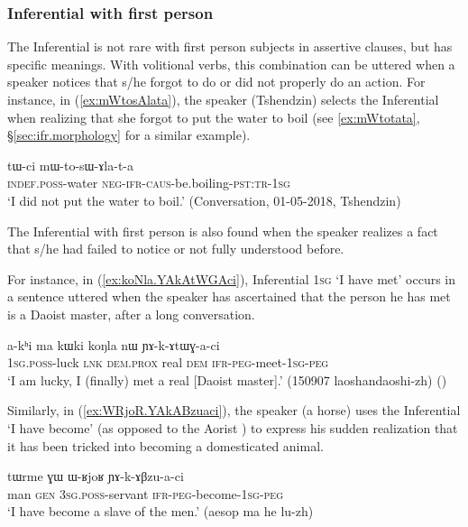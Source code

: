 \subsubsection{Inferential with first person} \label{sec:inf.1person}
The Inferential is not rare with first person subjects in assertive clauses, but has specific meanings.  With volitional verbs, this combination can be uttered when a speaker notices that s/he forgot to do or did not properly do an action. For instance, in (\ref{ex:mWtosAlata}), the speaker (Tshendzin) selects the Inferential when realizing that she forgot to put the water to boil (see \ref{ex:mWtotata}, §\ref{sec:ifr.morphology} for a similar example).

\begin{exe}
\ex \label{ex:mWtosAlata}
\gll tɯ-ci mɯ-to-sɯ-ɤla-t-a \\
\textsc{indef}.\textsc{poss}-water \textsc{neg}-\textsc{ifr}-\textsc{caus}-be.boiling-\textsc{pst}:\textsc{tr}-\textsc{1sg} \\
\glt `I did not put the water to boil.' (Conversation, 01-05-2018, Tshendzin)
\end{exe}

The Inferential with first person is also found when the speaker realizes a fact that s/he had failed to notice or not fully understood before.

For instance, in (\ref{ex:koNla.YAkAtWGAci}), Inferential \textsc{1sg}  `I have met' occurs in a sentence uttered when the speaker has ascertained that the person he has met is a Daoist master, after a long conversation.  

\begin{exe}
\ex \label{ex:koNla.YAkAtWGAci}
\gll  a-kʰi ma kɯki koŋla nɯ ɲɤ-k-ɤtɯɣ-a-ci \\
\textsc{1sg}.\textsc{poss}-luck \textsc{lnk} \textsc{dem}.\textsc{prox} real \textsc{dem} \textsc{ifr}-\textsc{peg}-meet-\textsc{1sg}-\textsc{peg} \\
\glt `I am lucky, I (finally) met a real [Daoist master].' (150907 laoshandaoshi-zh)
()
\end{exe}

Similarly, in (\ref{ex:WRjoR.YAkABzuaci}), the speaker (a horse) uses the Inferential  `I have become' (as opposed to the Aorist ) to express his sudden realization that it has been tricked into becoming a domesticated animal.

\begin{exe}
\ex \label{ex:WRjoR.YAkABzuaci}
\gll tɯrme ɣɯ ɯ-ʁjoʁ ɲɤ-k-ɤβzu-a-ci \\
man \textsc{gen} \textsc{3sg}.\textsc{poss}-servant \textsc{ifr}-\textsc{peg}-become-\textsc{1sg}-\textsc{peg} \\
\glt `I have become a slave of the men.' (aesop ma he lu-zh)
\end{exe}

